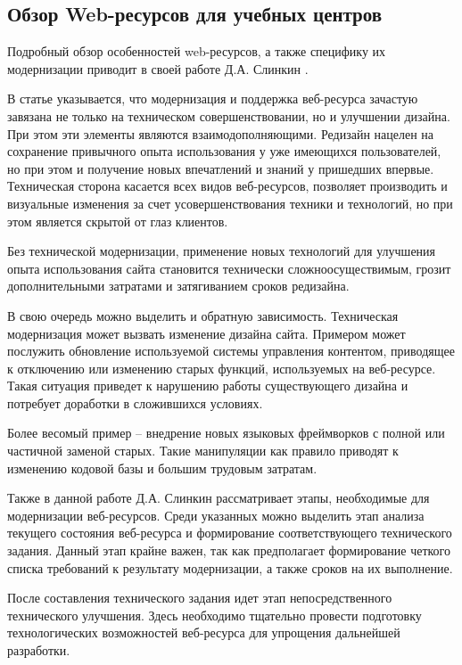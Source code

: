 \subsection{Обзор Web-ресурсов для учебных центров}

Подробный обзор особенностей web-ресурсов, а также специфику их модернизации приводит в своей работе Д.А. Слинкин \cite{slinkin-sovremennie}.

В статье указывается, что модернизация и поддержка веб-ресурса зачастую завязана не только на техническом совершенствовании, но и улучшении дизайна.
При этом эти элементы являются взаимодополняющими.
Редизайн нацелен на сохранение привычного опыта использования у уже имеющихся пользователей, но при этом и получение новых впечатлений и знаний у пришедших впервые.
Техническая сторона касается всех видов веб-ресурсов, позволяет производить и визуальные изменения за счет усовершенствования техники и технологий, но при этом является скрытой от глаз клиентов.

Без технической модернизации, применение новых технологий для улучшения опыта использования сайта становится технически сложноосуществимым, грозит дополнительными затратами и затягиванием сроков редизайна.

В свою очередь можно выделить и обратную зависимость.
Техническая модернизация может вызвать изменение дизайна сайта.
Примером может послужить обновление используемой системы управления контентом, приводящее к отключению или изменению старых функций, используемых на веб-ресурсе.
Такая ситуация приведет к нарушению работы существующего дизайна и потребует доработки в сложившихся условиях.

Более весомый пример -- внедрение новых языковых фреймворков с полной или частичной заменой старых.
Такие манипуляции как правило приводят к изменению кодовой базы и большим трудовым затратам. 

Также в данной работе Д.А. Слинкин рассматривает этапы, необходимые для модернизации веб-ресурсов.
Среди указанных можно выделить этап анализа текущего состояния веб-ресурса и формирование соответствующего технического задания.
Данный этап крайне важен, так как предполагает формирование четкого списка требований к результату модернизации, а также сроков на их выполнение.

После составления технического задания идет этап непосредственного технического улучшения.
Здесь необходимо тщательно провести подготовку технологических возможностей веб-ресурса для упрощения дальнейшей разработки.

